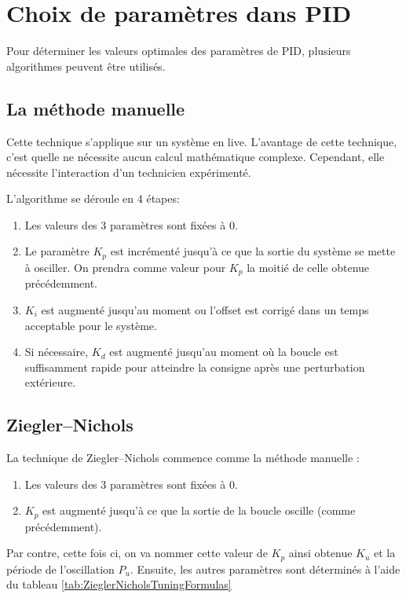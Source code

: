 \section{Choix de paramètres dans PID}

Pour déterminer les valeurs optimales des paramètres de PID, plusieurs algorithmes peuvent être utilisés.

\subsection{La méthode manuelle}
Cette technique s'applique sur un système en live.
L'avantage de cette technique, c'est quelle ne nécessite aucun calcul mathématique complexe.
Cependant, elle nécessite l'interaction d'un technicien expérimenté.

L'algorithme se déroule en 4 étapes:
\begin{enumerate}
	\item Les valeurs des 3 paramètres sont fixées à $0$.
	\item Le paramètre $K_p$ est incrémenté jusqu'à ce que la sortie du système se mette à osciller.
	On prendra comme valeur pour $K_p$ la moitié de celle obtenue précédemment.
	\item $K_i$ est augmenté jusqu'au moment ou l'offset est corrigé dans un temps acceptable pour le système.
	\item Si nécessaire, $K_d$ est augmenté jusqu'au moment où la boucle est suffisamment rapide pour atteindre la consigne après une perturbation extérieure.
\end{enumerate}

\subsection{Ziegler–Nichols}
La technique de Ziegler–Nichols commence comme la méthode manuelle :
\begin{enumerate}
	\item Les valeurs des 3 paramètres sont fixées à $0$.
	\item $K_p$ est augmenté jusqu'à ce que la sortie de la boucle oscille (comme précédemment).
\end{enumerate}

Par contre, cette fois ci, on va nommer cette valeur de $K_p$ ainsi obtenue $K_u$ et la période de l'oscillation $P_u$.
Ensuite, les autres paramètres sont déterminés à l'aide du tableau \ref{tab:ZieglerNicholsTuningFormulas}

